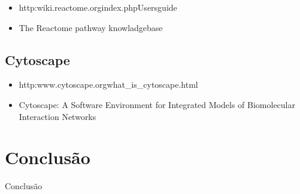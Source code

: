 \documentclass[conference]{IEEEtran}
\begin{document}
\begin{itemize}
\item http:\/\/wiki.reactome.org\/index.php\/Usersguide
\item The Reactome pathway knowladgebase
\end{itemize}

\subsection{Cytoscape}

\begin{itemize}
\item http:\/\/www.cytoscape.org\/what\_is\_cytoscape.html
\item Cytoscape: A Software Environment for Integrated Models of Biomolecular Interaction Networks
\end{itemize}

\section{Conclusão}

Conclusão





%
%

\end{document}
